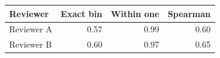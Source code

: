 \begin{tabular}{lrrr}
\toprule
Reviewer & Exact bin & Within one & Spearman \\
\midrule
Reviewer A & 0.57 & 0.99 & 0.60 \\
Reviewer B & 0.60 & 0.97 & 0.65 \\
\bottomrule
\end{tabular}
